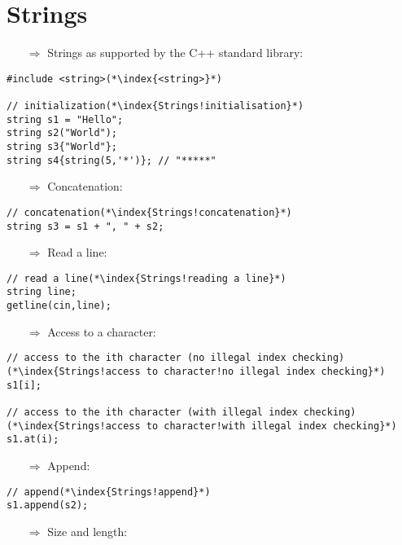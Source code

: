 \documentclass[10pt]{article}
\begin{document}
\section{Strings}
\small
\begin{enumerate}
\item[$\Rightarrow$] Strings as supported by the C++ standard library:
\end{enumerate}
\begin{lstlisting}
#include <string>(*\index{<string>}*)

// initialization(*\index{Strings!initialisation}*)
string s1 = "Hello";
string s2("World");
string s3{"World"};
string s4{string(5,'*')}; // "*****"
\end{lstlisting}
\begin{enumerate}
\item[$\Rightarrow$] Concatenation:
\end{enumerate}
\begin{lstlisting}
// concatenation(*\index{Strings!concatenation}*)
string s3 = s1 + ", " + s2;
\end{lstlisting}
\begin{enumerate}
\item[$\Rightarrow$] Read a line:
\end{enumerate}
\begin{lstlisting}
// read a line(*\index{Strings!reading a line}*)
string line;
getline(cin,line);
\end{lstlisting}
\begin{enumerate}
\item[$\Rightarrow$] Access to a character:
\end{enumerate}
\begin{lstlisting}
// access to the ith character (no illegal index checking)(*\index{Strings!access to character!no illegal index checking}*)
s1[i];

// access to the ith character (with illegal index checking)(*\index{Strings!access to character!with illegal index checking}*)
s1.at(i);
\end{lstlisting}
\begin{enumerate}
\item[$\Rightarrow$] Append:
\end{enumerate}
\begin{lstlisting}
// append(*\index{Strings!append}*)
s1.append(s2);
\end{lstlisting}
\begin{enumerate}
\item[$\Rightarrow$] Size and length:
\end{enumerate}
\end{document}
